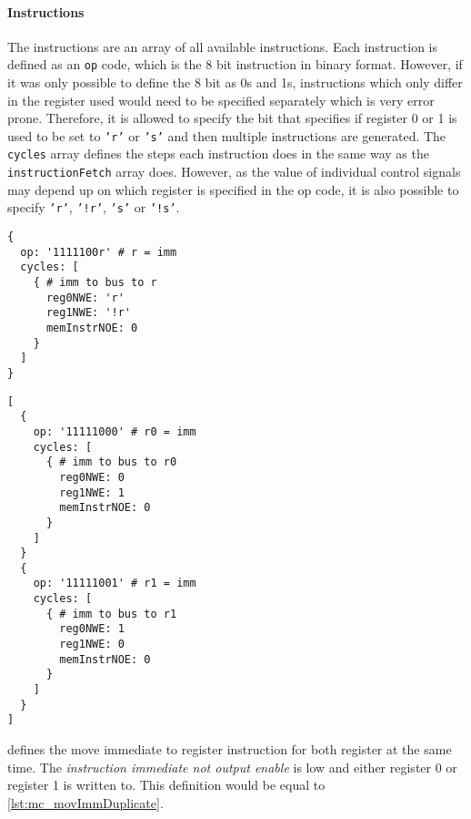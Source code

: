 \paragraph{Instructions} The instructions are an array of all available instructions.
Each instruction is defined as an \texttt{op} code, which is the 8 bit instruction in binary format.
However, if it was only possible to define the 8 bit as 0s and 1s, instructions which only differ in the register used would need to be specified separately which is very error prone.
Therefore, it is allowed to specify the bit that specifies if register 0 or 1 is used to be set to \texttt{'r'} or \texttt{'s'} and then multiple instructions are generated.
The \texttt{cycles} array defines the steps each instruction does in the same way as the \texttt{instructionFetch} array does.
However, as the value of individual control signals may depend up on which register is specified in the op code, it is also possible to specify \texttt{'r'}, \texttt{'!r'}, \texttt{'s'} or \texttt{'!s'}.

\begin{listing}[t]
  \begin{sublisting}[b]{.45\textwidth}
    \begin{verbatim}
{
  op: '1111100r' # r = imm
  cycles: [
    { # imm to bus to r
      reg0NWE: 'r'
      reg1NWE: '!r'
      memInstrNOE: 0
    }
  ]
}
    \end{verbatim}
    \caption{Definition using `r' in the opcode.}
    \label{lst:mc_movImm}
  \end{sublisting}
  \begin{sublisting}[b]{.5\textwidth}
    \begin{verbatim}
[
  {
    op: '11111000' # r0 = imm
    cycles: [
      { # imm to bus to r0
        reg0NWE: 0
        reg1NWE: 1
        memInstrNOE: 0
      }
    ]
  }
  {
    op: '11111001' # r1 = imm
    cycles: [
      { # imm to bus to r1
        reg0NWE: 1
        reg1NWE: 0
        memInstrNOE: 0
      }
    ]
  }
]
    \end{verbatim}
    \caption{Equivalent definition of both separate instructions.}
    \label{lst:mc_movImmDuplicate}
  \end{sublisting}
  \caption{Definition of the move immediate to register instruction for the microcode generation.}
\end{listing}
 defines the move immediate to register instruction for both register at the same time.
The \emph{instruction immediate not output enable} is low and either register 0 or register 1 is written to.
This definition would be equal to \cref{lst:mc_movImmDuplicate}.

